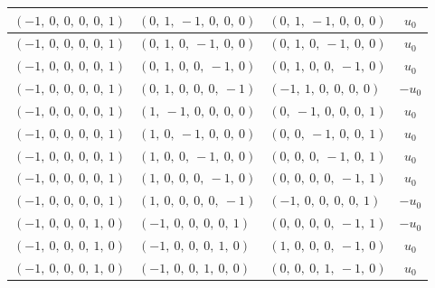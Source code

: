 \documentclass[11pt]{article}
\theoremstyle{definition}
\begin{document}
\begin{longtable}{|l|l|l|c|}
    \hline
    $\left( -1, \  0, \  0, \  0, \  0, \  1\right)$ & $\left( 0, \  1, \  -1, \  0, \  0, \  0\right)$ & $\left( 0, \  1, \  -1, \  0, \  0, \  0\right)$ & $u_{0}$ \\
    \hline
    $\left( -1, \  0, \  0, \  0, \  0, \  1\right)$ & $\left( 0, \  1, \  0, \  -1, \  0, \  0\right)$ & $\left( 0, \  1, \  0, \  -1, \  0, \  0\right)$ & $u_{0}$ \\
    \hline
    $\left( -1, \  0, \  0, \  0, \  0, \  1\right)$ & $\left( 0, \  1, \  0, \  0, \  -1, \  0\right)$ & $\left( 0, \  1, \  0, \  0, \  -1, \  0\right)$ & $u_{0}$ \\
    \hline
    $\left( -1, \  0, \  0, \  0, \  0, \  1\right)$ & $\left( 0, \  1, \  0, \  0, \  0, \  -1\right)$ & $\left( -1, \  1, \  0, \  0, \  0, \  0\right)$ & $- u_{0}$ \\
    \hline
    $\left( -1, \  0, \  0, \  0, \  0, \  1\right)$ & $\left( 1, \  -1, \  0, \  0, \  0, \  0\right)$ & $\left( 0, \  -1, \  0, \  0, \  0, \  1\right)$ & $u_{0}$ \\
    \hline
    $\left( -1, \  0, \  0, \  0, \  0, \  1\right)$ & $\left( 1, \  0, \  -1, \  0, \  0, \  0\right)$ & $\left( 0, \  0, \  -1, \  0, \  0, \  1\right)$ & $u_{0}$ \\
    \hline
    $\left( -1, \  0, \  0, \  0, \  0, \  1\right)$ & $\left( 1, \  0, \  0, \  -1, \  0, \  0\right)$ & $\left( 0, \  0, \  0, \  -1, \  0, \  1\right)$ & $u_{0}$ \\
    \hline
    $\left( -1, \  0, \  0, \  0, \  0, \  1\right)$ & $\left( 1, \  0, \  0, \  0, \  -1, \  0\right)$ & $\left( 0, \  0, \  0, \  0, \  -1, \  1\right)$ & $u_{0}$ \\
    \hline
    $\left( -1, \  0, \  0, \  0, \  0, \  1\right)$ & $\left( 1, \  0, \  0, \  0, \  0, \  -1\right)$ & $\left( -1, \  0, \  0, \  0, \  0, \  1\right)$ & $- u_{0}$ \\
    \hline
    $\left( -1, \  0, \  0, \  0, \  1, \  0\right)$ & $\left( -1, \  0, \  0, \  0, \  0, \  1\right)$ & $\left( 0, \  0, \  0, \  0, \  -1, \  1\right)$ & $- u_{0}$ \\
    \hline
    $\left( -1, \  0, \  0, \  0, \  1, \  0\right)$ & $\left( -1, \  0, \  0, \  0, \  1, \  0\right)$ & $\left( 1, \  0, \  0, \  0, \  -1, \  0\right)$ & $u_{0}$ \\
    \hline
    $\left( -1, \  0, \  0, \  0, \  1, \  0\right)$ & $\left( -1, \  0, \  0, \  1, \  0, \  0\right)$ & $\left( 0, \  0, \  0, \  1, \  -1, \  0\right)$ & $u_{0}$ \\

\end{longtable}
\end{document}
